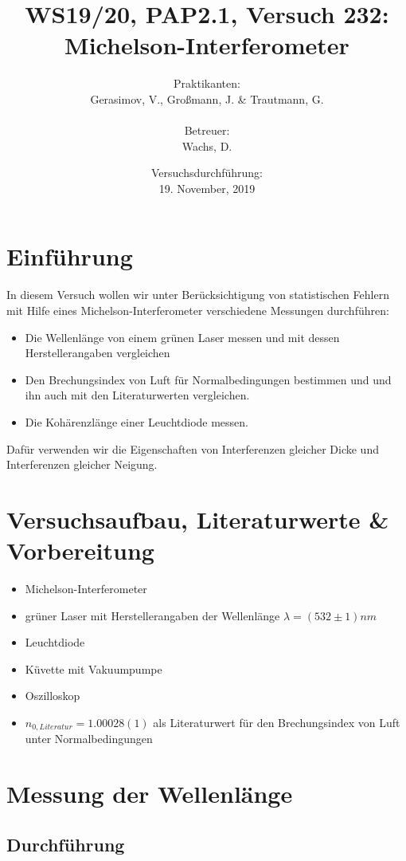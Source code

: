 \documentclass[a4paper,10pt]{article}
\title{WS19/20, PAP2.1, Versuch 232:\\ Michelson-Interferometer}
\date{Versuchsdurchführung: \\19. November, 2019}
\author{Praktikanten:\\Gerasimov, V., Großmann, J. \& Trautmann, G.\\\\ Betreuer:\\ Wachs, D.}
\begin{document}
\maketitle

\newpage

\tableofcontents



\section{Einführung}\boldmath
In diesem Versuch wollen wir unter Berücksichtigung von statistischen Fehlern mit Hilfe eines Michelson-Interferometer verschiedene Messungen durchführen:
\begin{itemize}
\item Die Wellenlänge von einem grünen Laser messen und mit dessen Herstellerangaben vergleichen
\item Den Brechungsindex von Luft für Normalbedingungen  bestimmen und und ihn auch mit den Literaturwerten vergleichen.
\item Die Kohärenzlänge einer Leuchtdiode messen.
\end{itemize}
Dafür verwenden wir die Eigenschaften von Interferenzen gleicher Dicke und Interferenzen gleicher Neigung.
\section{Versuchsaufbau, Literaturwerte \& Vorbereitung}
\begin{itemize}
\item Michelson-Interferometer
\item grüner Laser mit Herstellerangaben der Wellenlänge \(\lambda = (532\pm1) nm\)
\item Leuchtdiode
\item Küvette mit Vakuumpumpe
\item Oszilloskop
\item \( n_{0, Literatur} =1.00028(1)\) als Literaturwert für den Brechungsindex von Luft unter Normalbedingungen
\end{itemize}
\section{Messung der Wellenlänge}
\subsection[Durchführung]{Durchführung\fnrefb}
\end{document}
